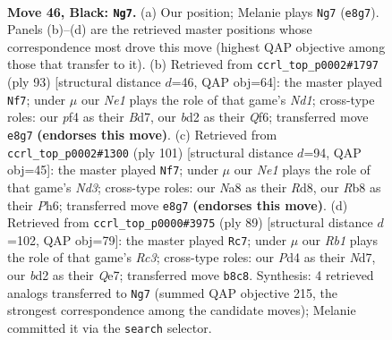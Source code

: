 \documentclass[11pt]{article}
\begin{document}
\clearpage

\begin{figure}[p]\centering
\begin{subfigure}{0.46\textwidth}\centering
\resizebox{\linewidth}{!}{%
\newchessgame
\chessboard[
  setfen={nr2n1k1/4b3/p4r2/P1pq1p1p/3p1Pp1/1P4P1/1R1BP2P/RQ1NN1K1 b - - 9 46},
  showmover=false,
  pgfstyle=straightmove, color=movearrow, markmove={e8-g7}
]}
\caption{}
\end{subfigure}\hfill
\begin{subfigure}{0.46\textwidth}\centering
\resizebox{\linewidth}{!}{%
\newchessgame
\chessboard[
  setfen={1r1nr1k1/p2b4/P1p2qp1/2Pp1p1p/1p3P2/1P1BPN1P/4R1P1/2R1Q2K b - - 24 47},
  showmover=false,
  pgfstyle=straightmove, color=movearrow, markmove={d8-f7}
]}
\caption{}
\end{subfigure}
\\[4pt]
\begin{subfigure}{0.46\textwidth}\centering
\resizebox{\linewidth}{!}{%
\newchessgame
\chessboard[
  setfen={3r2k1/8/3nr1pp/1ppqpp2/p7/P1PP3P/1P1N1PP1/2QRR1K1 b - - 9 51},
  showmover=false,
  pgfstyle=straightmove, color=movearrow, markmove={d6-f7}
]}
\caption{}
\end{subfigure}\hfill
\begin{subfigure}{0.46\textwidth}\centering
\resizebox{\linewidth}{!}{%
\newchessgame
\chessboard[
  setfen={8/3nqp1k/r1rpb1p1/p3p2p/N1P1P3/1PQ1R2P/2B2PP1/R5K1 b - - 11 45},
  showmover=false,
  pgfstyle=straightmove, color=movearrow, markmove={c6-c7}
]}
\caption{}
\end{subfigure}
\caption{\textbf{Move 46, Black: \texttt{Ng7}.} (a) Our position; Melanie plays \texttt{Ng7} (\texttt{e8g7}). Panels (b)--(d) are the retrieved master positions whose correspondence most drove this move (highest QAP objective among those that transfer to it). (b) Retrieved from \texttt{ccrl\_top\_p0002\#1797} (ply 93) [structural distance $d$=46, QAP obj=64]: the master played \texttt{Nf7}; under $\mu$ our \emph{Ne1} plays the role of that game's \emph{Nd1}; cross-type roles: our \emph{p}f4 as their \emph{B}d7, our \emph{b}d2 as their \emph{Q}f6; transferred move \texttt{e8g7} \textbf{(endorses this move)}. (c) Retrieved from \texttt{ccrl\_top\_p0002\#1300} (ply 101) [structural distance $d$=94, QAP obj=45]: the master played \texttt{Nf7}; under $\mu$ our \emph{Ne1} plays the role of that game's \emph{Nd3}; cross-type roles: our \emph{N}a8 as their \emph{R}d8, our \emph{R}b8 as their \emph{P}h6; transferred move \texttt{e8g7} \textbf{(endorses this move)}. (d) Retrieved from \texttt{ccrl\_top\_p0000\#3975} (ply 89) [structural distance $d$=102, QAP obj=79]: the master played \texttt{Rc7}; under $\mu$ our \emph{Rb1} plays the role of that game's \emph{Rc3}; cross-type roles: our \emph{P}d4 as their \emph{N}d7, our \emph{b}d2 as their \emph{Q}e7; transferred move \texttt{b8c8}. Synthesis: 4 retrieved analogs transferred to \texttt{Ng7} (summed QAP objective 215, the strongest correspondence among the candidate moves); Melanie committed it via the \texttt{search} selector.}
\label{fig:thought-m91}
\end{figure}
\end{document}
